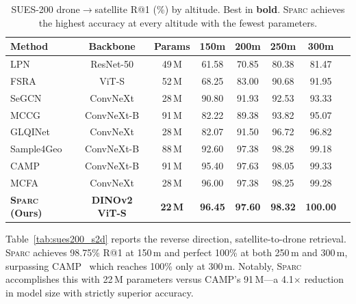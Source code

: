 \documentclass[sigconf, anonymous, review]{acmart}
\newcommand{\ours}{\textsc{Sparc}}
\begin{document}
\begin{table}[t]
\caption{SUES-200 drone$\to$satellite R@1 (\%) by altitude. Best in \textbf{bold}. \ours{} achieves the highest accuracy at every altitude with the fewest parameters.}
\label{tab:sues200_d2s}
\centering
\small
\setlength{\tabcolsep}{4pt}
\begin{tabular}{@{}lccccccc@{}}
\toprule
\textbf{Method} & \textbf{Backbone} & \textbf{Params} & \textbf{150m} & \textbf{200m} & \textbf{250m} & \textbf{300m} \\
\midrule
LPN & ResNet-50 & 49\,M & 61.58 & 70.85 & 80.38 & 81.47 \\
FSRA & ViT-S & 52\,M & 68.25 & 83.00 & 90.68 & 91.95 \\
SeGCN & ConvNeXt & 28\,M & 90.80 & 91.93 & 92.53 & 93.33 \\
MCCG & ConvNeXt-B & 91\,M & 82.22 & 89.38 & 93.82 & 95.07 \\
GLQINet & ConvNeXt & 28\,M & 82.07 & 91.50 & 96.72 & 96.82 \\
Sample4Geo & ConvNeXt-B & 88\,M & 92.60 & 97.38 & 98.28 & 99.18 \\
CAMP & ConvNeXt-B & 91\,M & 95.40 & 97.63 & 98.05 & 99.33 \\
MCFA & ConvNeXt & 28\,M & 96.00 & 97.38 & 98.25 & 99.28 \\
\midrule
\rowcolor{bestrow}
\textbf{\ours{} (Ours)} & \textbf{DINOv2 ViT-S} & \textbf{22\,M} & \textbf{96.45} & \textbf{97.60} & \textbf{98.32} & \textbf{100.00} \\
\bottomrule
\end{tabular}
\end{table}

Table~\ref{tab:sues200_s2d} reports the reverse direction, satellite-to-drone retrieval.
\ours{} achieves 98.75\% R@1 at 150\,m and perfect 100\% at both 250\,m and 300\,m, surpassing CAMP~\cite{yang2024camp} which reaches 100\% only at 300\,m.
Notably, \ours{} accomplishes this with 22\,M parameters versus CAMP's 91\,M---a 4.1$\times$ reduction in model size with strictly superior accuracy.
\end{document}
